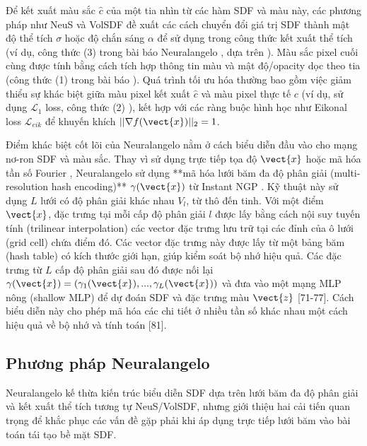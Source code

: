 Để kết xuất màu sắc $\hat{c}$ của một tia nhìn từ các hàm SDF và màu này, các phương pháp như NeuS \cite{Wang21NeuS} và VolSDF \cite{Yariv21VolSDF} đề xuất các cách chuyển đổi giá trị SDF thành mật độ thể tích $\sigma$ hoặc độ chắn sáng $\alpha$ để sử dụng trong công thức kết xuất thể tích (ví dụ, công thức (3) trong bài báo Neuralangelo \cite{Li23Neuralangelo}, dựa trên \cite{Wang21NeuS}). Màu sắc pixel cuối cùng được tính bằng cách tích hợp thông tin màu và mật độ/opacity dọc theo tia (công thức (1) trong bài báo \cite{Li23Neuralangelo}). Quá trình tối ưu hóa thường bao gồm việc giảm thiểu sự khác biệt giữa màu pixel kết xuất $\hat{c}$ và màu pixel thực tế $c$ (ví dụ, sử dụng $\mathcal{L}_1$ loss, công thức (2) \cite{Li23Neuralangelo}), kết hợp với các ràng buộc hình học như Eikonal loss $\mathcal{L}_{eik}$ để khuyến khích $||\nabla f(\vect{x})||_2 = 1$.

Điểm khác biệt cốt lõi của Neuralangelo nằm ở cách biểu diễn đầu vào cho mạng nơ-ron SDF và màu sắc. Thay vì sử dụng trực tiếp tọa độ $\vect{x}$ hoặc mã hóa tần số Fourier \cite{Tancik20Fourier}, Neuralangelo sử dụng **mã hóa lưới băm đa độ phân giải (multi-resolution hash encoding)** $\gamma(\vect{x})$ từ Instant NGP \cite{Muller22InstantNGP}. Kỹ thuật này sử dụng $L$ lưới có độ phân giải khác nhau $V_l$, từ thô đến tinh. Với một điểm $\vect{x}$, đặc trưng tại mỗi cấp độ phân giải $l$ được lấy bằng cách nội suy tuyến tính (trilinear interpolation) các vector đặc trưng lưu trữ tại các đỉnh của ô lưới (grid cell) chứa điểm đó. Các vector đặc trưng này được lấy từ một bảng băm (hash table) có kích thước giới hạn, giúp kiểm soát bộ nhớ hiệu quả. Các đặc trưng từ $L$ cấp độ phân giải sau đó được nối lại $\gamma(\vect{x}) = (\gamma_1(\vect{x}), ..., \gamma_L(\vect{x}))$ và đưa vào một mạng MLP nông (shallow MLP) để dự đoán SDF và đặc trưng màu $\vect{z}$ [71-77]. Cách biểu diễn này cho phép mã hóa các chi tiết ở nhiều tần số khác nhau một cách hiệu quả về bộ nhớ và tính toán [81].

\subsection{Phương pháp Neuralangelo}
\label{subsec:neuralangelo_method}

Neuralangelo kế thừa kiến trúc biểu diễn SDF dựa trên lưới băm đa độ phân giải và kết xuất thể tích tương tự NeuS/VolSDF, nhưng giới thiệu hai cải tiến quan trọng để khắc phục các vấn đề gặp phải khi áp dụng trực tiếp lưới băm vào bài toán tái tạo bề mặt SDF.

